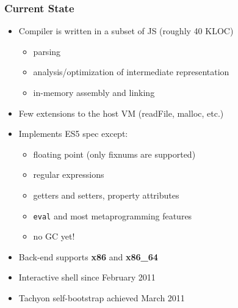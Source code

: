 \begin{frame}
\frametitle{\bf Current State}

  \begin{itemize}

  \item Compiler is written in a subset of JS (roughly 40 KLOC)
    \begin{itemize}
    \item parsing
    \item analysis/optimization of intermediate representation
    \item in-memory assembly and linking
    \end{itemize}
    \smallskip

  \item Few extensions to the host VM (readFile, malloc, etc.)
    \smallskip

  \item Implements ES5 spec except:
    \begin{itemize}
    \item floating point (only fixnums are supported)
    \item regular expressions
    \item getters and setters, property attributes
    \item {\tt eval} and most metaprogramming features
    \item no GC yet!
    \end{itemize}
    \smallskip

  \item Back-end supports {\bf x86} and {\bf x86\_64}
    \smallskip

  \item Interactive shell since February 2011
    \smallskip

  \item Tachyon self-bootstrap achieved March 2011
    \smallskip

  \end{itemize}
\end{frame}

